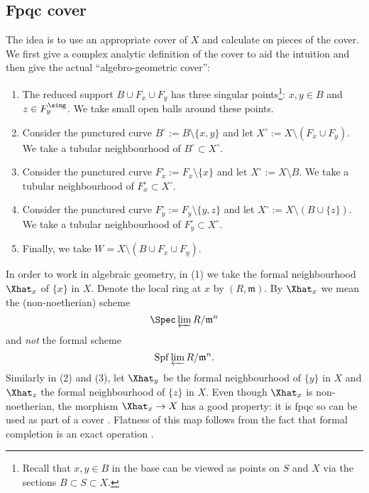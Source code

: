 \subsection{Fpqc cover}

The idea is to use an appropriate cover of $X$ and calculate on pieces of the cover. We first give a complex analytic definition of the cover to aid the intuition and then give the actual ``algebro-geometric cover'': 
\begin{enumerate}
\item The reduced support $B \cup F_x \cup F_y$ has three singular points\footnote{Recall that $x,y \in B$ in the base can be viewed as points on $S$ and $X$ via the sections $B \subset S \subset X$.}: $x,y \in B$ and $z \in F^{\sing}_{y}$. We take small open balls around these points.
\item Consider the punctured curve $B^\circ := B \setminus \{x,y\}$ and let $X^\circ := X \setminus (F_x  \cup F_y)$. We take a tubular neighbourhood of $B^\circ \subset X^\circ$.
\item Consider the punctured curve $F_{x}^{\circ} := F_x \setminus \{x\}$ and let $X^\circ := X \setminus B$. We take a tubular neighbourhood of $F_{x}^\circ \subset X^\circ$.
\item Consider the punctured curve $F_{y}^{\circ} := F_y \setminus \{y,z\}$ and let $X^\circ := X \setminus (B \cup \{z\})$. We take a tubular neighbourhood of $F_{y}^{\circ} \subset X^\circ$.
\item Finally, we take $W = X \setminus (B \cup F_x \cup F_y)$. 
\end{enumerate}

In order to work in algebraic geometry, in (1) we take the formal
neighbourhood $\Xhat _x$ of $\{x\}$ in $X$. Denote the local ring at
$x$ by $(R,\mathfrak{m})$. By $\Xhat _x$ we mean the (non-noetherian)
scheme
$$
\Spec \varprojlim R / \mathfrak{m}^n 
$$
and \emph{not} the formal scheme $$\mathrm{Spf} \varprojlim R /
\mathfrak{m}^n.$$ Similarly in (2) and (3), let $\Xhat _y$ be the
formal neighbourhood of $\{y\}$ in $X$ and $\Xhat _z$ the formal
neighbourhood of $\{z\}$ in $X$.  Even though $\Xhat _x$ is
non-noetherian, the morphism $\Xhat _x \rightarrow X$ has a good
property: it is fpqc so can be used as part of a cover \cite[Vistoli,
Sect.~2.3.2]{Fundamental-algebraic-geometry}. Flatness of this map
follows from the fact that formal completion is an exact operation
\cite[Tag 0BNH]{stacks-project} \cite[Prop.~10.14]{Atiyah-Macdonald}.

